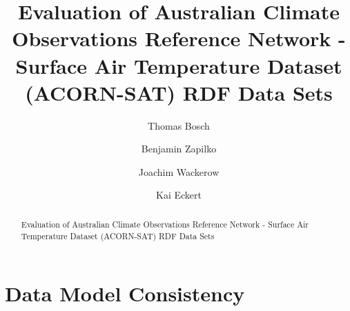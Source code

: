 \documentclass{llncs}
\begin{document}
\renewcommand{\arraystretch}{1.3}
%
%
\title{Evaluation of Australian Climate Observations Reference Network - Surface Air Temperature Dataset (ACORN-SAT) RDF Data Sets}
\subtitle{}

%
\author{Thomas Bosch \and Benjamin Zapilko \and Joachim Wackerow \and Kai Eckert}
%
\authorrunning{} %
%

\maketitle              %

\begin{abstract}
Evaluation of Australian Climate Observations Reference Network - Surface Air Temperature Dataset (ACORN-SAT) RDF Data Sets


\end{abstract}

\section{Data Model Consistency}
\end{document}
